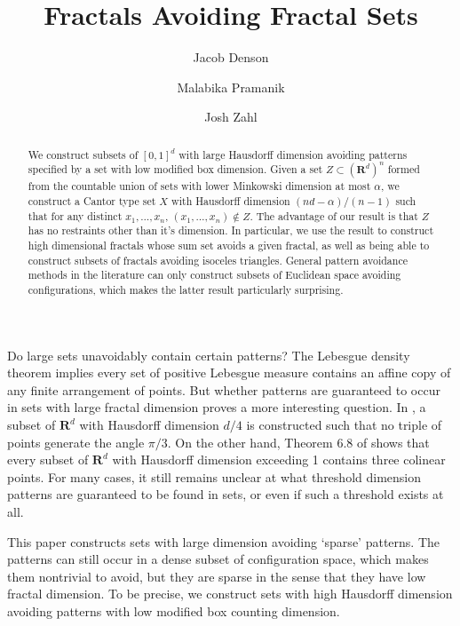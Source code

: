 \documentclass[usenames,dvipsnames]{article}
\title{Fractals Avoiding Fractal Sets}
\author{Jacob Denson\\ \and Malabika Pramanik\\ \and Josh Zahl}
\theoremstyle{plain}
\theoremstyle{plain}
\begin{document}
\maketitle


\begin{abstract}
	We construct subsets of $[0,1]^d$ with large Hausdorff dimension avoiding patterns specified by a set with low modified box dimension. Given a set $Z \subset (\mathbf{R}^d)^n$ formed from the countable union of sets with lower Minkowski dimension at most $\alpha$, we construct a Cantor type set $X$ with Hausdorff dimension $(nd - \alpha) / (n-1)$ such that for any distinct $x_1, \dots, x_n$, $(x_1, \dots, x_n) \not \in Z$. The advantage of our result is that $Z$ has no restraints other than it's dimension. In particular, we use the result to construct high dimensional fractals whose sum set avoids a given fractal, as well as being able to construct subsets of fractals avoiding isoceles triangles. General pattern avoidance methods in the literature can only construct subsets of Euclidean space avoiding configurations, which makes the latter result particularly surprising.
\end{abstract}


Do large sets unavoidably contain certain patterns? The Lebesgue density theorem implies every set of positive Lebesgue measure contains an affine copy of any finite arrangement of points. But whether patterns are guaranteed to occur in sets with large fractal dimension proves a more interesting question. %
In \cite{Mathe}, a subset of $\mathbf{R}^d$ with Hausdorff dimension $d/4$ is constructed such that no triple of points generate the angle $\pi/3$. On the other hand, Theorem 6.8 of \cite{Matilla} shows that every subset of $\mathbf{R}^d$ with Hausdorff dimension exceeding 1 contains three colinear points. For many cases, it still remains unclear at what threshold dimension patterns are guaranteed to be found in sets, or even if such a threshold exists at all.

This paper constructs sets with large dimension avoiding `sparse' patterns. The patterns can still occur in a dense subset of configuration space, which makes them nontrivial to avoid, but they are sparse in the sense that they have low fractal dimension. To be precise, we construct sets with high Hausdorff dimension avoiding patterns with low modified box counting dimension.
\end{document}
